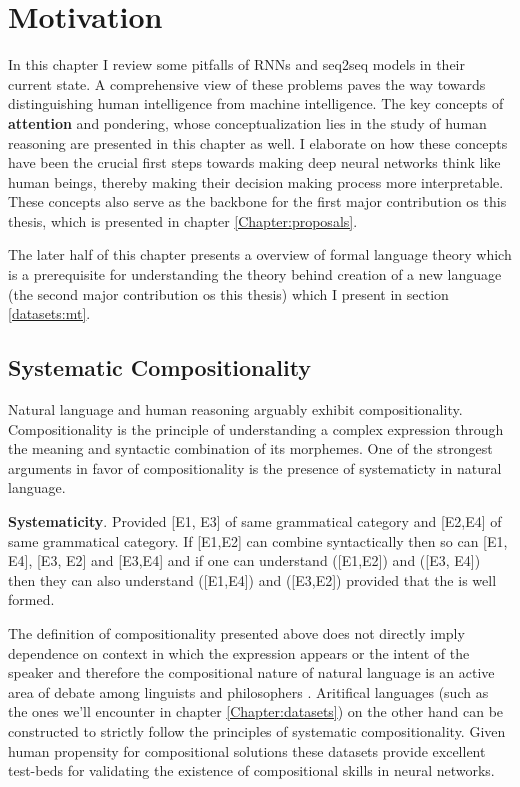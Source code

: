 \chapter{Motivation} \label{Chapter:motivation}

In this chapter I review some pitfalls of RNNs and seq2seq models in their current state. A comprehensive view of these problems paves the way towards distinguishing human intelligence from machine intelligence. The key concepts of \textbf{attention} and {pondering}, whose conceptualization lies in the study of human reasoning are presented in this chapter as well. I elaborate on how these concepts have been the crucial first steps towards making deep neural networks think like human beings, thereby making their decision making process more interpretable. These concepts also serve as the backbone for the first major contribution os this thesis, which is presented in chapter \ref{Chapter:proposals}.

The later half of this chapter presents a overview of formal language theory which is a prerequisite for understanding the theory behind creation of a new language (the second major contribution os this thesis) which I present in section \ref{datasets:mt}.

\section{Systematic Compositionality} \label{systematic}
Natural language and human reasoning arguably exhibit compositionality. Compositionality is the principle of understanding a complex expression through the meaning and syntactic combination of its morphemes. One of the strongest arguments in favor of compositionality is the presence of systematicty in natural language.

\textbf{Systematicity}. Provided [E1, E3] of same grammatical category and [E2,E4] of same grammatical category. If [E1,E2] can combine syntactically then so can [E1, E4], [E3, E2] and [E3,E4] and if one can understand ([E1,E2]) and ([E3, E4]) then they can also understand ([E1,E4]) and ([E3,E2]) provided that the is well formed.

The definition of compositionality presented above does not directly imply dependence on context in which the expression appears or the intent of the speaker and therefore the compositional nature of natural language is an active area of debate among linguists and philosophers \citep{sep-compositionality}. Aritifical languages (such as the ones we'll encounter in chapter \ref{Chapter:datasets}) on the other hand can be constructed to strictly follow the principles of systematic compositionality. Given human propensity for compositional solutions \citep{NIPS2016_6130} these datasets provide excellent test-beds for validating the existence of compositional skills in neural networks. 

